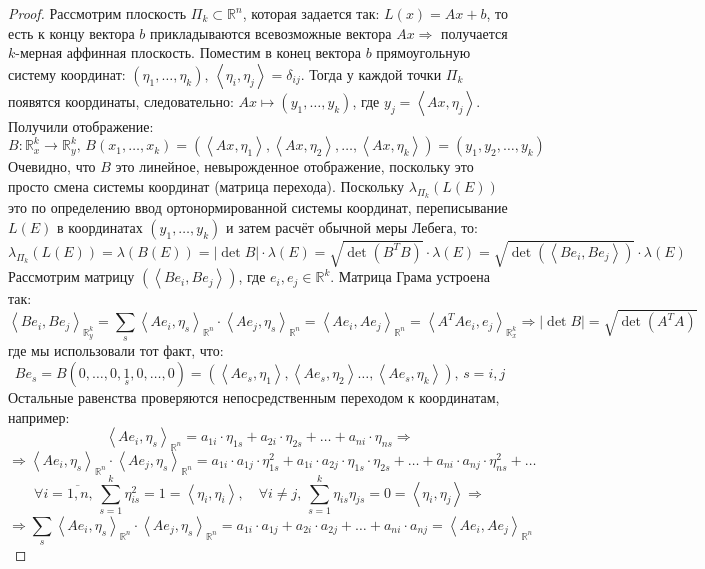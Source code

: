 \documentclass[12pt]{article}
\newcommand{\MR}{\mathbb{R}}
\theoremstyle{definition}
\newcommand{\ddsum}[2]{\displaystyle\sum\limits_{#1}^{#2}}
\newcommand{\inner}[2]{\left\langle #1, #2 \right\rangle }
\newcommand{\ovl}[1]{\overline{#1}}
\begin{document}
\begin{proof}
	Рассмотрим плоскость $\Pi_k \subset \MR^n$, которая задается так: $L(x) = Ax + b$, то есть к концу вектора $b$ прикладываются всевозможные вектора $Ax \Rightarrow$ получается $k$-мерная аффинная плоскость. Поместим в конец вектора $b$ прямоугольную систему координат: $(\eta_1,\dotsc, \eta_k), \, \inner{\eta_i}{\eta_j} = \delta_{ij}$. Тогда у каждой точки $\Pi_k$ появятся координаты, следовательно: $Ax \mapsto (y_1,\dotsc, y_k)$, где $y_j = \inner{Ax}{\eta_j}$. Получили отображение: 
	$$
		B \colon \MR_x^k \to \MR_y^k, \, B(x_1,\dotsc,x_k) = (\inner{Ax}{\eta_1}, \inner{Ax}{\eta_2}, \dotsc, \inner{Ax}{\eta_k}) = (y_1,y_2,\dotsc, y_k)
	$$
	Очевидно, что $B$ это линейное, невырожденное отображение, поскольку это просто смена системы координат (матрица перехода). Поскольку $\lambda_{\Pi_k}(L(E))$ это по определению ввод ортонормированной системы координат,  переписывание $L(E)$ в координатах $(y_1,\dotsc, y_k)$ и затем расчёт обычной меры Лебега, то:
	$$
		\lambda_{\Pi_k}(L(E)) = \lambda(B(E)) = |\det{B}|{\cdot}\lambda(E) = \sqrt{\det(B^TB)}{\cdot}\lambda(E) = \sqrt{\det(\inner{Be_i}{Be_j})}{\cdot}\lambda(E) 
	$$
	Рассмотрим матрицу $(\inner{Be_i}{Be_j})$, где $e_i, e_j \in \MR^k$. Матрица Грама устроена так:
	$$
		\inner{Be_i}{Be_j}_{\MR^k_y} = \ddsum{s}{}\inner{Ae_i}{\eta_s}_{\MR^n} {\cdot}\inner{Ae_j}{\eta_s}_{\MR^n} = \inner{Ae_i}{Ae_j}_{\MR^n} = \inner{A^TAe_i}{e_j}_{\MR^k_x} \Rightarrow |\det{B}| = \sqrt{\det(A^TA)}
	$$
	где мы использовали тот факт, что: 
	$$
		Be_s = B(0, \dotsc, 0, \underset{s}{1}, 0, \dotsc, 0) = (\inner{Ae_s}{\eta_1}, \inner{Ae_s}{\eta_2} \dotsc, \inner{Ae_s}{\eta_k}), \, s = i,j
	$$
	Остальные равенства проверяются непосредственным переходом к координатам, например:
	$$
		\inner{Ae_i}{\eta_s}_{\MR^n} = a_{1i}{\cdot}\eta_{1s} + a_{2i}{\cdot}\eta_{2s} + \dotsc + a_{ni}{\cdot}\eta_{ns} \Rightarrow 
	$$
	$$	
		\Rightarrow \inner{Ae_i}{\eta_s}_{\MR^n} {\cdot}\inner{Ae_j}{\eta_s}_{\MR^n} = a_{1i}{\cdot}a_{1j}{\cdot}\eta_{1s}^2 + a_{1i}{\cdot}a_{2j}{\cdot}\eta_{1s}{\cdot}\eta_{2s} + \dotsc + a_{ni}{\cdot}a_{nj}{\cdot}\eta_{ns}^2 + \dotsc
	$$
	$$
		\forall i = \ovl{1,n}, \, \ddsum{s = 1}{k}\eta_{is}^2 = 1 = \inner{\eta_i}{\eta_i}, \quad \forall i \neq j, \, \ddsum{s = 1}{k}\eta_{is}\eta_{js} = 0 = \inner{\eta_i}{\eta_j} \Rightarrow
	$$
	$$
		\Rightarrow  \ddsum{s}{}\inner{Ae_i}{\eta_s}_{\MR^n} {\cdot}\inner{Ae_j}{\eta_s}_{\MR^n} = a_{1i}{\cdot}a_{1j} + a_{2i}{\cdot}a_{2j} + \dotsc + a_{ni}{\cdot}a_{nj} = \inner{Ae_i}{Ae_j}_{\MR^n}
	$$
\end{proof}
\end{document}
